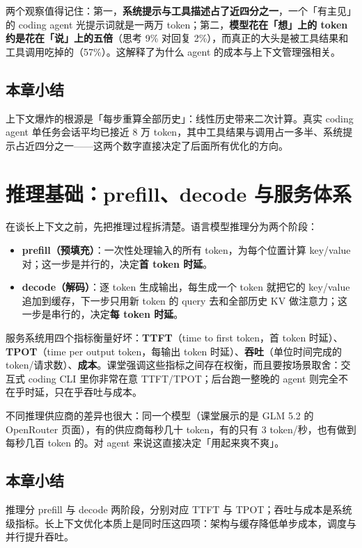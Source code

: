 \documentclass[a4paper]{article}
\begin{document}
两个观察值得记住：第一，\textbf{系统提示与工具描述占了近四分之一}，一个「有主见」的 coding agent 光提示词就是一两万 token；第二，\textbf{模型花在「想」上的 token 约是花在「说」上的五倍}（思考 9\% 对回复 2\%），而真正的大头是被工具结果和工具调用吃掉的（57\%）。这解释了为什么 agent 的成本与上下文管理强相关。

\subsection{本章小结}
上下文爆炸的根源是「每步重算全部历史」：线性历史带来二次计算。真实 coding agent 单任务会话平均已接近 8 万 token，其中工具结果与调用占一多半、系统提示占近四分之一——这两个数字直接决定了后面所有优化的方向。

\section{推理基础：prefill、decode 与服务体系}

在谈长上下文之前，先把推理过程拆清楚。语言模型推理分为两个阶段：

\begin{itemize}
\item \textbf{prefill（预填充）}：一次性处理输入的所有 token，为每个位置计算 key/value 对；这一步是并行的，决定\textbf{首 token 时延}。
\item \textbf{decode（解码）}：逐 token 生成输出，每生成一个 token 就把它的 key/value 追加到缓存，下一步只用新 token 的 query 去和全部历史 KV 做注意力；这一步是串行的，决定\textbf{每 token 时延}。
\end{itemize}

服务系统用四个指标衡量好坏：\textbf{TTFT}（time to first token，首 token 时延）、\textbf{TPOT}（time per output token，每输出 token 时延）、\textbf{吞吐}（单位时间完成的 token/请求数）、\textbf{成本}。课堂强调这些指标之间存在权衡，而且要按场景取舍：交互式 coding CLI 里你非常在意 TTFT/TPOT；后台跑一整晚的 agent 则完全不在乎时延，只在乎吞吐与成本。

不同推理供应商的差异也很大：同一个模型（课堂展示的是 GLM 5.2 的 OpenRouter 页面），有的供应商每秒几十 token，有的只有 3 token/秒，也有做到每秒几百 token 的。对 agent 来说这直接决定「用起来爽不爽」。

\subsection{本章小结}
推理分 prefill 与 decode 两阶段，分别对应 TTFT 与 TPOT；吞吐与成本是系统级指标。长上下文优化本质上是同时压这四项：架构与缓存降低单步成本，调度与并行提升吞吐。
\end{document}
